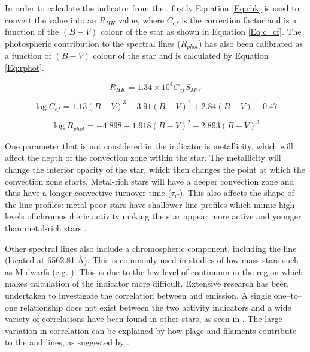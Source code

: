 In order to calculate the \Rprime indicator from the \Smw, firstly Equation \ref{Eq:rhk} is used to convert the \Smw value into an $R_{HK}$ value, where $C_{cf}$ is the correction factor and is a function of the $(B-V)$ colour of the star as shown in Equation \ref{Eq:c_cf}. The photospheric contribution to the \caII spectral lines ($R_{phot}$) has also been calibrated as a function of $(B-V)$ colour of the star and is calculated by Equation \ref{Eq:rphot}.

\begin{equation}
    R_{HK} = 1.34{\times}10^{4}C_{cf}S_{MW}
    \label{Eq:rhk}
\end{equation}

\begin{equation}
    \log C_{cf} = 1.13(B - V)^{3} - 3.91(B-V)^{2} + 2.84(B-V) - 0.47
    \label{Eq:c_cf}
\end{equation}

\begin{equation}
    \log R_{phot} = -4.898 + 1.918(B-V)^{2} - 2.893(B-V)^{3}
    \label{Eq:rphot}
\end{equation}

One parameter that is not considered in the \Rprime indicator is metallicity, which will affect the depth of the convection zone within the star. The metallicity will change the interior opacity of the star, which then changes the point at which the convection zone starts. Metal-rich stars will have a deeper convection zone and thus have a longer convective turnover time ($\tau_{C}$). This also affects the shape of the \caII line profiles: metal-poor stars have shallower line profiles which mimic high levels of chromospheric activity making the star appear more active and younger than metal-rich stars \citep{Rocha-Pinto_Maciel_1998}.

Other spectral lines also include a chromospheric component, including the \Halpha line (located at 6562.81 \AA). This is commonly used in studies of low-mass stars such as M dwarfs (e.g. \citealt{Newton_etal_2017}). This is due to the low level of continuum in the \caII region which makes calculation of the \Rprime indicator more difficult. Extensive research has been undertaken to investigate the correlation between \caII and \Halpha emission. A single one--to--one relationship does not exist between the two activity indicators and a wide variety of correlations have been found in other stars, as seen in \citet{Cincunegui_etal_2007}. The large variation in correlation can be explained by how plage and filaments contribute to the \caII and \Halpha lines, as suggested by \citet{Meunier_Delfosse_2009}.

